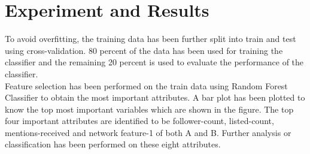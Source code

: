 \documentclass[sigconf]{acmart}
\begin{document}
\section{Experiment and Results}
To avoid overfitting, the training data has been further split into train and test using cross-validation. 80 percent of the data has been used for training the classifier and the remaining 20 percent is used to evaluate the performance of the classifier. \\
Feature selection has been performed on the train data using Random Forest Classifier to obtain the most important attributes. A bar plot has been plotted to know the top most important variables which are shown in the figure. The top four important attributes are identified to be follower-count, listed-count, mentions-received and network feature-1 of both A and B. Further analysis or classification has been performed on these eight attributes.
\end{document}
